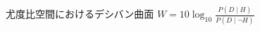 \begin{figure}[htbp]
  \centering
  \resizebox{0.95\linewidth}{!}{%
  }
  \caption{尤度比空間におけるデシバン曲面 $W = 10 \log_{10} \frac{P(D \mid H)}{P(D \mid \neg H)}$}
  \label{fig:deciban_surface}
\end{figure}



